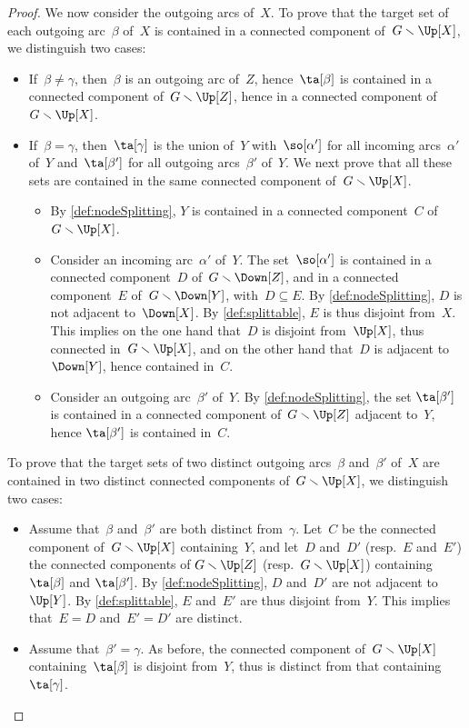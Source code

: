 \documentclass{amsart}
\theoremstyle{definition}
\newcommand{\ssm}{\smallsetminus} %
\begin{document}
\begin{proof}
  We now consider the outgoing arcs of~$X$.
  To prove that the target set of each outgoing arc~$\beta$ of~$X$ is contained in a connected component of~$G \ssm \Up[X]$, we distinguish two cases:
  \begin{itemize}
    \item If~$\beta \ne \gamma$, then~$\beta$ is an outgoing arc of~$Z$, hence~$\ta[\beta]$ is contained in a connected component of~$G \ssm \Up[Z]$, hence in a connected component of~$G \ssm \Up[X]$.
    \item If~$\beta = \gamma$, then~$\ta[\gamma]$ is the union of~$Y$ with~$\so[\alpha']$ for all incoming arcs~$\alpha'$ of~$Y$ and~$\ta[\beta']$ for all outgoing arcs~$\beta'$ of~$Y$. We next prove that all these sets are contained in the same connected component of~$G \ssm \Up[X]$.
    \begin{itemize}
      \item By \cref{def:nodeSplitting}, $Y$ is contained in a connected component~$C$ of~$G \ssm \Up[X]$. 
      \item Consider an incoming arc~$\alpha'$ of~$Y$. The set~$\so[\alpha']$ is contained in a connected component~$D$ of~$G \ssm \Down[Z]$, and in a connected component~$E$ of~$G \ssm \Down[Y]$, with~$D \subseteq E$. By \cref{def:nodeSplitting}, $D$ is not adjacent to~$\Down[X]$. By \cref{def:splittable}, $E$ is thus disjoint from~$X$. This implies on the one hand that~$D$ is disjoint from~$\Up[X]$, thus connected in~$G \ssm \Up[X]$, and on the other hand that~$D$ is adjacent to~$\Down[Y]$, hence contained in~$C$. 
      \item Consider an outgoing arc~$\beta'$ of~$Y$. By \cref{def:nodeSplitting}, the set $\ta[\beta']$ is contained in a connected component of~$G \ssm \Up[Z]$ adjacent to~$Y$, hence $\ta[\beta']$ is contained in~$C$.
    \end{itemize}
  \end{itemize}
  To prove that the target sets of two distinct outgoing arcs~$\beta$ and~$\beta'$ of~$X$ are contained in two distinct connected components of~$G \ssm \Up[X]$, we distinguish two cases:
  \begin{itemize}
  \item Assume that~$\beta$ and~$\beta'$ are both distinct from~$\gamma$. Let~$C$ be the connected component of~$G \ssm \Up[X]$ containing~$Y$, and let~$D$ and~$D'$ (resp.~$E$ and~$E'$) the connected components of $G \ssm \Up[Z]$ (resp.~$G \ssm \Up[X]$) containing~$\ta[\beta]$ and $\ta[\beta']$. By \cref{def:nodeSplitting}, $D$ and~$D'$ are not adjacent to~$\Up[Y]$. By \cref{def:splittable}, $E$ and~$E'$ are thus disjoint from~$Y$. This implies that~$E = D$ and~$E' = D'$ are distinct.
  \item Assume that~$\beta' = \gamma$. As before, the connected component of~$G \ssm \Up[X]$ containing~$\ta[\beta]$ is disjoint from~$Y$, thus is distinct from that containing~$\ta[\gamma]$.
  \qedhere
  \end{itemize}
\end{proof}
\end{document}
